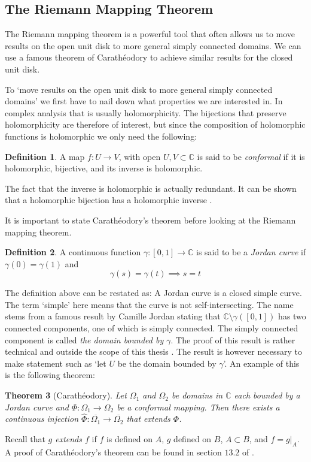 \documentclass[a4paper,12pt,twoside,BCOR=10mm]{scrbook}
\newtheorem{theorem}{Theorem}[section]
\theoremstyle{definition}
\theoremstyle{definition}
\theoremstyle{definition}
\newtheorem{definition}[theorem]{Definition}
\begin{document}
\subsection{The Riemann Mapping Theorem} 
The Riemann mapping theorem is a powerful tool that often allows us to move results on the open unit disk to more general simply connected domains.
We can use a famous theorem of Carathéodory to achieve similar results for the closed unit disk.

To `move results on the open unit disk to more general simply connected domains' we first have to nail down what properties we are interested in.
In complex analysis that is usually holomorphicity.
The bijections that preserve holomorphicity are therefore of interest, but since the composition of holomorphic functions is holomorphic we only need the following:
\begin{definition}
\label{index6}
A map $f: U \rightarrow V$, with open $U, V \subset \mathbb{C}$ is said to be \emph{conformal} if it is holomorphic, bijective, and its inverse is holomorphic.
\end{definition}
The fact that the inverse is holomorphic is actually redundant.
It can be shown that a holomorphic bijection has a holomorphic inverse \citep{greenkrantz}.

It is important to state Carathéodory's theorem before looking at the Riemann mapping theorem.
\begin{definition}
\label{index7}
A continuous function $\gamma: [0, 1] \rightarrow \mathbb{C}$ is said to be a \emph{Jordan curve} if $\gamma(0) = \gamma(1)$ and
\[
	\gamma(s) = \gamma(t) \implies s = t \tag*{for all $s, t \in ]0, 1[$.}
\]
\end{definition}
The definition above can be restated as: A Jordan curve is a closed simple curve.
The term `simple' here means that the curve is not self-intersecting.
The name stems from a famous result by Camille Jordan stating that $\mathbb{C} \setminus \gamma([0, 1])$ has two connected components, one of which is simply connected.
The simply connected component is called \emph{the domain bounded by $\gamma$}.
The proof of this result is rather technical and outside the scope of this thesis \citep{munkres, greenkrantz}.
The result is however necessary to make statement such as `let $U$ be the domain bounded by $\gamma$'.
An example of this is the following theorem:
\begin{theorem}[Carathéodory]
Let $\Omega_1$ and $\Omega_2$ be domains in $\mathbb{C}$ each bounded by a Jordan curve and $\Phi: \Omega_1 \rightarrow \Omega_2$ be a conformal mapping.
Then there exists a continuous injection $\hat{\Phi}: \overline{\Omega_1} \rightarrow \overline{\Omega_2}$ that extends $\Phi$.
\end{theorem}
\label{index8}
Recall that \emph{$g$ extends $f$} if
	$f$ is defined on $A$,
	$g$ defined on $B$,
	$A \subset B$,
	and $f = g|_A$.
A proof of Carathéodory's theorem can be found in section $13.2$ of \citep{greenkrantz}.
\end{document}
